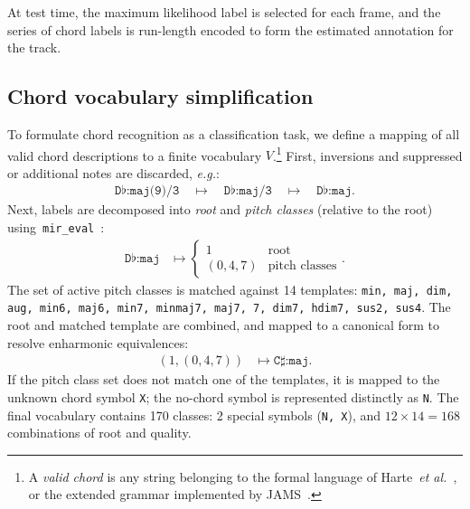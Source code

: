 \documentclass{article}
\def\eg{\emph{e.g.}}
\begin{document}
At test time, the maximum likelihood label is selected for each frame, and the series of chord labels is run-length encoded to form the estimated annotation for the track.


\subsection{Chord vocabulary simplification}

\label{sec:vocab}
%

To formulate chord recognition as a classification task, we define a mapping of all valid chord descriptions to a finite vocabulary $V$.\footnote{A \emph{valid chord} is any string belonging to the formal language of Harte~\emph{et al.}~\cite{harte2005symbolic}, or the extended grammar implemented by JAMS~\cite{humphrey2014jams}.}
First, inversions and suppressed or additional notes are discarded, \eg:
\begin{align*}
    \texttt{D}\flat\texttt{:maj(9)/3} 
    \quad\mapsto\quad \texttt{D}\flat\texttt{:maj/3}
    \quad\mapsto\quad \texttt{D}\flat\texttt{:maj}.
\end{align*}
Next, labels are decomposed into \emph{root} and \emph{pitch classes} (relative to the root) using~\texttt{mir\_eval}~\cite{raffel2014mir_eval}:
\begin{align*}
    \texttt{D}\flat\texttt{:maj} &\mapsto \begin{cases}
        1 & \text{root}\\
        (0, 4, 7) & \text{pitch classes}
    \end{cases}.
\end{align*}
The set of active pitch classes is matched against 14 templates: \texttt{min, maj, dim, aug, min6, maj6, min7, minmaj7, maj7, 7, dim7, hdim7, sus2, sus4}.
The root and matched template are combined, and mapped to a canonical form to resolve enharmonic equivalences:
\begin{align*}
    \left(1, (0, 4, 7) \right) &\mapsto \texttt{C}\sharp\texttt{:maj}.
\end{align*}
If the pitch class set does not match one of the templates, it is mapped to the unknown chord symbol \texttt{X}; the no-chord symbol is represented distinctly as \texttt{N}.
The final vocabulary contains 170 classes: 2 special symbols (\texttt{N, X}), and $12\times14=168$ combinations of root and quality.
\end{document}
